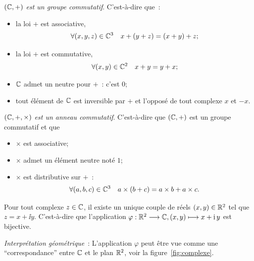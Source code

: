 \begin{prop}
  \emph{\((\mathbb{C}, + )\) est un groupe commutatif}. C'est-à-dire que~:
  \begin{itemize}
    \item la loi \( + \) est associative,
      \begin{equation}
        \forall (x, y, z) \in{}\mathbb{C}^3 \quad x + (y + z) = (x + y) + z;
      \end{equation}
    \item la loi \( + \) est commutative,
      \begin{equation}
        \forall (x,y) \in{}\mathbb{C}^2 \quad x + y = y + x;
      \end{equation}
    \item \(\mathbb{C}\) admet un neutre pour \(+\)~: c'est \(0\);
    \item tout élément de \(\mathbb{C}\) est inversible par \(+\) et l'opposé de
      tout complexe \(x\) et \(-x\).
  \end{itemize}
\end{prop}

\begin{prop}
  \emph{\((\mathbb{C}, + ,\times)\) est un anneau commutatif}. C'est-à-dire que \((\mathbb{C},
  + )\) est un groupe commutatif et que
  \begin{itemize}
    \item \(\times\) est associative;
    \item \(\times\) admet un élément neutre noté \(1\);
    \item \(\times\) est distributive sur \( + \)~:
      \begin{equation}
        \forall (a, b, c) \in{}\mathbb{C}^3 \quad a \times (b + c) = a \times b +
        a \times c.
      \end{equation}
  \end{itemize}
\end{prop}

\begin{prop}
  Pour tout complexe \(z \in{}\mathbb{C}\), il existe un unique couple de réels \((x,
  y) \in{}\mathbb{R}^2\) tel que \(z = x + \ii{}y\). C'est-à-dire que l'application
  \(\varphi:\mathbb{R}^2 \longrightarrow{} \mathbb{C}, (x, y) \longmapsto{} x + \operatorname{i}{}y\) est bijective.
\end{prop}

\emph{Interprétation géométrique}~: L'application \(\varphi\) peut être vue comme
une ``correspondance'' entre \(\mathbb{C}\) et le plan \(\mathbb{R}^2\), voir la
figure~\ref{fig:complexe}.

